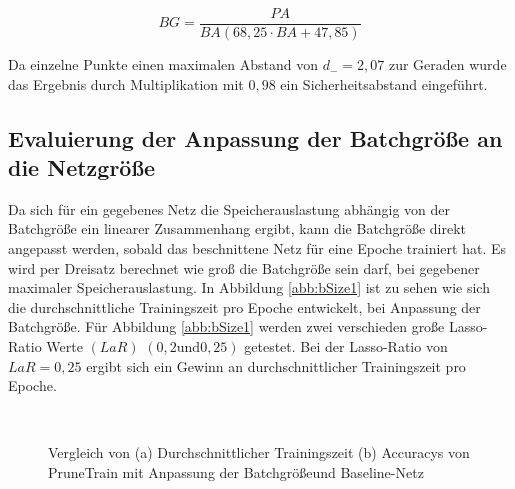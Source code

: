 \begin{equation}
 BG=\frac{PA}{BA\left( 68,25 \cdot BA + 47,85\right)}
\end{equation}


Da einzelne Punkte einen maximalen Abstand von $d_{-}=2,07$ zur Geraden wurde das Ergebnis durch Multiplikation mit $0,98$ ein Sicherheitsabstand eingeführt.


\subsection{Evaluierung der Anpassung der Batchgröße an die Netzgröße}

Da sich für ein gegebenes Netz die Speicherauslastung abhängig von der Batchgröße ein linearer Zusammenhang ergibt, kann die Batchgröße direkt angepasst werden, sobald das beschnittene Netz für eine Epoche trainiert hat. Es wird per Dreisatz berechnet wie groß die Batchgröße sein darf, bei gegebener maximaler Speicherauslastung. In Abbildung \ref{abb:bSize1} ist zu sehen wie sich die durchschnittliche Trainingszeit pro Epoche entwickelt, bei Anpassung der Batchgröße. Für Abbildung \ref{abb:bSize1} werden zwei verschieden große Lasso-Ratio Werte $(LaR)$ $(0,2 \text{und} 0,25)$ getestet. Bei der Lasso-Ratio von $LaR=0,25$ ergibt sich ein Gewinn an durchschnittlicher Trainingszeit pro Epoche. 


 \begin{figure}
     \centering
     \hfill
     \\
     \caption{Vergleich von (a) Durchschnittlicher Trainingszeit (b) Accuracys von PruneTrain mit Anpassung der Batchgrößeund Baseline-Netz}
     \label{abb:bSize}
\end{figure}

